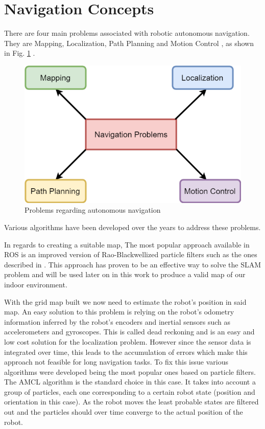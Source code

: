 



\section {Navigation Concepts}
There are four main problems associated with robotic autonomous navigation. They are Mapping, Localization, Path Planning and Motion Control \cite{nav}, as shown in Fig. \ref{fig:probNav} . 

\begin{figure}[ht!] 
\centerline{\includegraphics [width=0.6 \textwidth]{imgs/chapter3/navprobs.png}}
\caption{Problems regarding autonomous navigation}
\label{fig:probNav}
\end{figure}
Various algorithms have been developed over the years to address these problems. 

In regards to creating a suitable map,  The most popular approach available in \ac{ROS}  is an improved version of  Rao-Blackwellized particle filters such as the ones described in \cite{grisetti2007improved}. This approach has proven to be an effective way to solve the \ac{SLAM} problem and will be used later on in this work to produce a valid map of our indoor environment.

With the grid map built we now need to estimate the robot's position in said map. 
An easy solution to this problem is relying on the robot's odometry information inferred by the robot's encoders and inertial sensors such as accelerometers and gyroscopes. This is called dead reckoning and is an easy and low cost solution for the localization problem. However since the sensor data is integrated over time, this leads to the accumulation of errors which make this approach not feasible for long navigation tasks. 
To fix this issue various algorithms were developed being the most popular ones based on particle filters. The \ac{AMCL} \cite{amclpaper} algorithm  is the standard choice in this case. It takes into account a group of particles, each one corresponding to a certain robot state (position and orientation in this case). As the robot moves the least probable states are filtered out and  the particles should over time converge to the actual position of the robot.  

